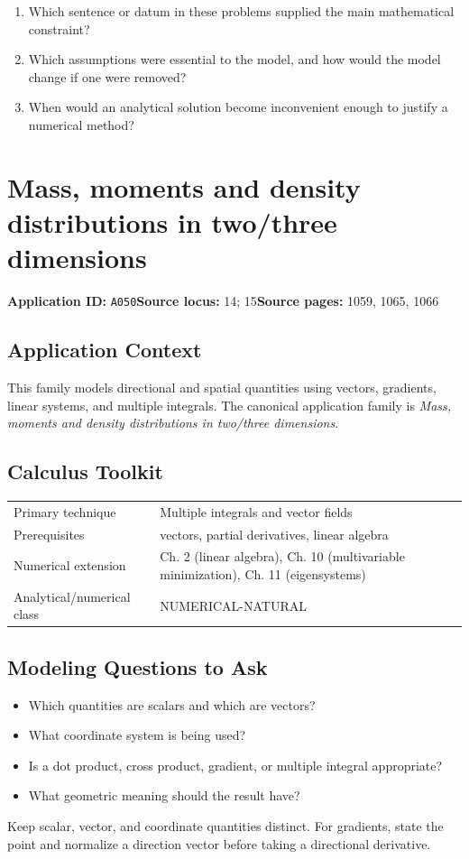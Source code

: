 \documentclass[11pt]{book}
\newcommand{\pid}[1]{\texttt{#1}}
\begin{document}
\begin{reflectionbox}\begin{enumerate}
\item Which sentence or datum in these problems supplied the main mathematical constraint?
\item Which assumptions were essential to the model, and how would the model change if one were removed?
\item When would an analytical solution become inconvenient enough to justify a numerical method?
\end{enumerate}\end{reflectionbox}
\chapter{Mass, moments and density distributions in two/three dimensions}\label{app:A050}
\textbf{Application ID:} \pid{A050}\quad \textbf{Source locus:} 14; 15\quad \textbf{Source pages:} 1059, 1065, 1066
\section*{Application Context}
This family models directional and spatial quantities using vectors, gradients, linear systems, and multiple integrals. The canonical application family is \emph{Mass, moments and density distributions in two/three dimensions}.
\section*{Calculus Toolkit}
\begin{tabularx}{\textwidth}{@{}lX@{}}\toprule
Primary technique & Multiple integrals and vector fields \\
Prerequisites & vectors, partial derivatives, linear algebra \\
Numerical extension & Ch. 2 (linear algebra), Ch. 10 (multivariable minimization), Ch. 11 (eigensystems) \\
Analytical/numerical class & NUMERICAL-NATURAL \\
\bottomrule\end{tabularx}
\section*{Modeling Questions to Ask}\begin{itemize}
\item Which quantities are scalars and which are vectors?
\item What coordinate system is being used?
\item Is a dot product, cross product, gradient, or multiple integral appropriate?
\item What geometric meaning should the result have?
\end{itemize}
\begin{errorbox}Keep scalar, vector, and coordinate quantities distinct. For gradients, state the point and normalize a direction vector before taking a directional derivative.\end{errorbox}
\end{document}
